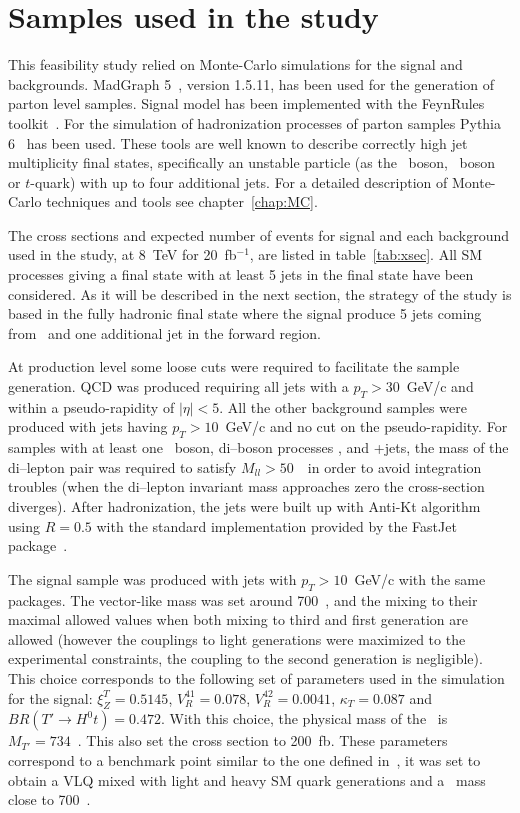 
\section{Samples used in the study}
\label{sec:PhenoSam}

This feasibility study relied on Monte-Carlo simulations for the signal and backgrounds. MadGraph 5~\cite{Alwall:2014hca, Alwall:2011uj}, version 1.5.11, has been used for the generation of parton level samples. Signal model has been implemented with the FeynRules toolkit~\cite{Alloul:2013bka}. For the simulation of hadronization processes of parton samples Pythia 6~\cite{Sjostrand:2006za} has been used. These tools are well known to describe correctly high jet multiplicity final states, specifically an unstable particle (as the \W~boson, \Z~boson or $t$-quark) with up to four additional jets. For a detailed description of Monte-Carlo techniques and tools see chapter~\ref{chap:MC}. 

The cross sections and expected number of events for signal and each background used in the study, at 8~TeV for 20~fb$^{-1}$, are listed in table~\ref{tab:xsec}. All SM processes giving a final state with at least 5 jets in the final state have been considered. As it will be described in the next section, the strategy of the study is based in the fully hadronic final state where the signal produce 5 jets coming from \Tp~and one additional jet in the forward region.

At production level some loose cuts were required to facilitate the sample generation. QCD was produced requiring all jets with a $p_{T}>30$~GeV/c and within a pseudo-rapidity of $|\eta|<5$. All the other background samples were produced with jets having $p_{T}>10$~GeV/c and no cut on the pseudo-rapidity. For samples with at least one \Z~boson, di--boson processes \Z\Z, \W\Z and \Z+jets, the mass of the di--lepton pair was required to satisfy $M_{ll}>50$~\GeVcc~in order to avoid integration troubles (when the di--lepton invariant mass approaches zero the cross-section diverges). After hadronization, the jets were built up with Anti-Kt algorithm using $R=0.5$ with the standard implementation provided by the FastJet package~\cite{Cacciari:2011ma}.

The signal sample was produced with jets with $p_{T}>10$~GeV/c with the same packages. The vector-like mass was set around 700~\GeVcc, and the mixing to their maximal allowed values when both mixing to third and first generation are allowed (however the couplings to light generations were maximized to the experimental constraints, the coupling to the second generation is negligible). This choice corresponds to the following set of parameters used in the simulation for the signal: $\xi_Z^{T}=0.5145$, $V_{R}^{41}=0.078$, $V_{R}^{42}=0.0041$, $\kappa_{T}=0.087$ and $BR(T' \to H^{0} t)=0.472$. With this choice, the physical mass of the \Tp~is $M_{T'}=734$~\GeVcc. This also set the cross section to 200~fb. These parameters correspond to a benchmark point similar to the one defined in~\cite{Cacciapaglia:2011fx}, it was set to obtain a VLQ mixed with light and heavy SM quark generations and a \Tp~mass close to 700~\GeVcc.

